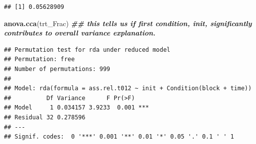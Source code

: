 \documentclass[
]{article}
\newenvironment{Shaded}{\begin{snugshade}}{\end{snugshade}}
\newcommand{\DocumentationTok}[1]{\textcolor[rgb]{0.56,0.35,0.01}{\textbf{\textit{#1}}}}
\newcommand{\FunctionTok}[1]{\textcolor[rgb]{0.13,0.29,0.53}{\textbf{#1}}}
\newcommand{\NormalTok}[1]{#1}
\begin{document}
\begin{verbatim}
## [1] 0.05628909
\end{verbatim}

\begin{Shaded}
\begin{Highlighting}[]
\FunctionTok{anova.cca}\NormalTok{(trt\_Frac) }\DocumentationTok{\#\# this tells us if first condition, init, significantly contributes to overall variance explanation. }
\end{Highlighting}
\end{Shaded}

\begin{verbatim}
## Permutation test for rda under reduced model
## Permutation: free
## Number of permutations: 999
## 
## Model: rda(formula = ass.rel.t012 ~ init + Condition(block + time))
##          Df Variance      F Pr(>F)    
## Model     1 0.034157 3.9233  0.001 ***
## Residual 32 0.278596                  
## ---
## Signif. codes:  0 '***' 0.001 '**' 0.01 '*' 0.05 '.' 0.1 ' ' 1
\end{verbatim}
\end{document}
